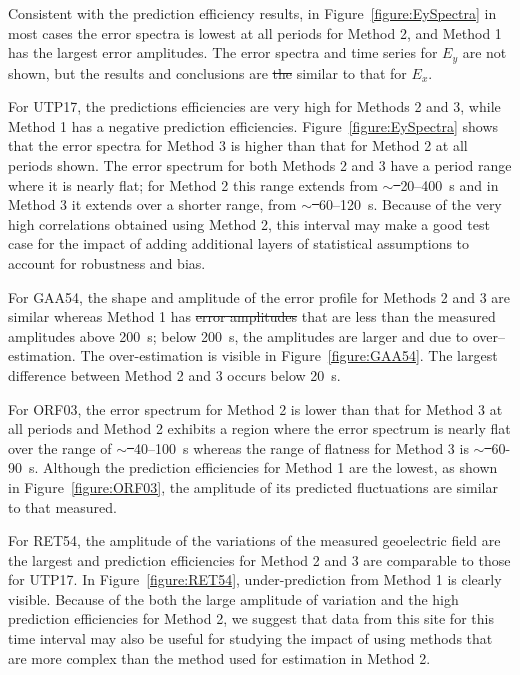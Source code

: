 \documentclass[12pt]{article}
\providecommand{\DIFadd}[1]{{\protect\color{blue}\uwave{#1}}} %
\providecommand{\DIFdel}[1]{{\protect\color{red}\sout{#1}}}                      %
\providecommand{\DIFaddbegin}{} %
\providecommand{\DIFaddend}{} %
\providecommand{\DIFdelbegin}{} %
\providecommand{\DIFdelend}{} %
\begin{document}

Consistent with the prediction efficiency results, in Figure~\ref{figure:EySpectra} in most cases the error spectra is lowest at all periods for Method 2, and Method 1 has the largest error amplitudes. The error spectra and time series for $E_y$ are not shown, but the results and conclusions are \DIFdelbegin \DIFdel{the }\DIFdelend similar to that for $E_x$. 

For UTP17, the predictions efficiencies are very high for Methods 2 and 3, while Method 1 has a negative prediction efficiencies.  Figure~\ref{figure:EySpectra} shows that the error spectra for Method 3 is higher than that for Method 2 at all periods shown.  The error spectrum for both Methods 2 and 3 have a period range where it is nearly flat; for Method 2 this range extends from $\sim$\DIFdelbegin \DIFdel{~}\DIFdelend 20--400~s and in Method 3 it extends over a shorter range, from $\sim$\DIFdelbegin \DIFdel{~}\DIFdelend 60--120~s.  Because of the very high correlations obtained using Method 2, this interval may make a good test case for the impact of adding additional layers of statistical assumptions to account for robustness and bias.

For GAA54, the shape and amplitude of the error profile for Methods 2 and 3 are similar whereas Method 1 has \DIFdelbegin \DIFdel{error amplitudes }\DIFdelend \DIFaddbegin \DIFadd{errors }\DIFaddend that are less than the measured amplitudes above 200~s; below 200~s, the amplitudes are larger and due to over--estimation.  The over-estimation is visible in Figure~\ref{figure:GAA54}.  The largest difference between Method 2 and 3 occurs below 20~s.

For ORF03, the error spectrum for Method 2 is lower than that for Method 3 at all periods and Method 2 exhibits a region where the error spectrum is nearly flat over the range of $\sim$\DIFdelbegin \DIFdel{~}\DIFdelend 40--100~s whereas the range of flatness for Method 3 is $\sim$\DIFdelbegin \DIFdel{~}\DIFdelend 60-90~s.  Although the prediction efficiencies for Method 1 are the lowest, as shown in Figure~\ref{figure:ORF03}, the amplitude of its predicted fluctuations are similar to that measured.

For RET54, the amplitude of the variations of the measured geoelectric field are the largest and prediction efficiencies for Method 2 and 3 are comparable to those for UTP17.  In Figure~\ref{figure:RET54}, under-prediction from Method 1 is clearly visible.  Because of the both the large amplitude of variation and the high prediction efficiencies for Method 2, we suggest that data from this site for this time interval may also be useful for studying the impact of using methods that are more complex than the method used for estimation in Method 2.
\end{document}
